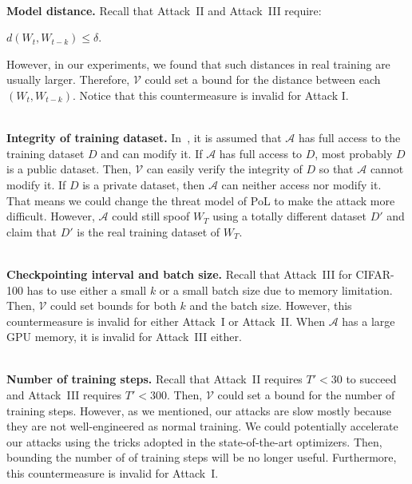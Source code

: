 \documentclass[conference]{IEEEtran}
\newcommand{\Verif}{\mathcal{V}\xspace}
\newcommand{\Adv}{\mathcal{A}\xspace}
\newcommand{\Paragraph}[1]{~\vspace*{-0.8\baselineskip}\\{\bf #1}}
\begin{document}
\Paragraph{Model distance.}
Recall that Attack~II and Attack~III require:
\begin{center}
    $d(W_t, W_{t-k}) \leq \delta$.
\end{center}
However, in our experiments, we {found\EndAccSupp{}} that such distances in real training are usually larger. 
Therefore, $\Verif$ could set a bound for the distance between each $(W_t, W_{t-k})$.
Notice that this {countermeasure\EndAccSupp{}} is invalid for Attack I.






\Paragraph{Integrity of training dataset.}
In~\cite{PoL}, it is assumed that $\Adv$ has full access to the training {dataset\EndAccSupp{}} $D$ and can modify it. 
If $\Adv$ has full access to $D$, most probably $D$ is a {public\EndAccSupp{}} dataset. 
Then, $\Verif$ can easily verify the integrity of $D$ so that $\Adv$ cannot modify it.
If $D$ is a private dataset, then $\Adv$ can neither access nor modify it.
That means we could change the threat model of PoL to make the attack more difficult.
However, $\Adv$ could still {spoof\EndAccSupp{}} $W_T$ using a totally different {dataset\EndAccSupp{}} $D'$ and claim that $D'$ is the real training dataset of $W_T$. 





\Paragraph{Checkpointing interval and batch size.}
Recall that Attack~III for CIFAR-100 has to use either a small $k$ or a small batch size due to memory limitation. 
Then, $\Verif$ could set bounds for both $k$ and the batch size.
However, this {countermeasure\EndAccSupp{}} is invalid for either Attack~I or Attack~II.
When $\Adv$ has a large GPU memory, it is invalid for Attack~III either.



\Paragraph{Number of training steps.}
Recall that Attack~II requires $T'<30$ to succeed and Attack~III requires $T'<300$. 
Then, $\Verif$ could set a bound for the number of training steps. 
However, as we mentioned, our attacks are slow mostly because they are not well-engineered as normal training.
We could potentially accelerate our attacks using the tricks adopted in the state-of-the-art optimizers.
Then, bounding the number of of training steps will be no longer useful.
Furthermore, this {countermeasure\EndAccSupp{}} is invalid for Attack~I.
\end{document}
